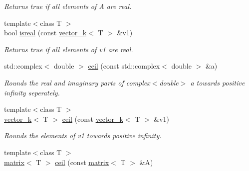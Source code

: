 \begin{DoxyCompactItemize}
\begin{DoxyCompactList}\small\item\em Returns true if all elements of A are real. \end{DoxyCompactList}\item 
\hypertarget{namespacekeycpp_ae5db41667f15caabbbdf37362e2f1990}{{\footnotesize template$<$class T $>$ }\\bool \hyperlink{namespacekeycpp_ae5db41667f15caabbbdf37362e2f1990}{isreal} (const \hyperlink{classkeycpp_1_1vector__k}{vector\-\_\-k}$<$ T $>$ \&v1)}\label{namespacekeycpp_ae5db41667f15caabbbdf37362e2f1990}

\begin{DoxyCompactList}\small\item\em Returns true if all elements of v1 are real. \end{DoxyCompactList}\item 
\hypertarget{namespacekeycpp_a005c1190f7087fb1d2545c38c080fd1a}{std\-::complex$<$ double $>$ \hyperlink{namespacekeycpp_a005c1190f7087fb1d2545c38c080fd1a}{ceil} (const std\-::complex$<$ double $>$ \&a)}\label{namespacekeycpp_a005c1190f7087fb1d2545c38c080fd1a}

\begin{DoxyCompactList}\small\item\em Rounds the real and imaginary parts of complex$<$double$>$ a towards positive infinity seperately. \end{DoxyCompactList}\item 
\hypertarget{namespacekeycpp_abc86c63af2d6788c45ac99a1f3b14ad8}{{\footnotesize template$<$class T $>$ }\\\hyperlink{classkeycpp_1_1vector__k}{vector\-\_\-k}$<$ T $>$ \hyperlink{namespacekeycpp_abc86c63af2d6788c45ac99a1f3b14ad8}{ceil} (const \hyperlink{classkeycpp_1_1vector__k}{vector\-\_\-k}$<$ T $>$ \&v1)}\label{namespacekeycpp_abc86c63af2d6788c45ac99a1f3b14ad8}

\begin{DoxyCompactList}\small\item\em Rounds the elements of v1 towards positive infinity. \end{DoxyCompactList}\item 
\hypertarget{namespacekeycpp_a4bba31744fef3693901a075fda07857c}{{\footnotesize template$<$class T $>$ }\\\hyperlink{classkeycpp_1_1matrix}{matrix}$<$ T $>$ \hyperlink{namespacekeycpp_a4bba31744fef3693901a075fda07857c}{ceil} (const \hyperlink{classkeycpp_1_1matrix}{matrix}$<$ T $>$ \&A)}\label{namespacekeycpp_a4bba31744fef3693901a075fda07857c}


\end{DoxyCompactItemize}
